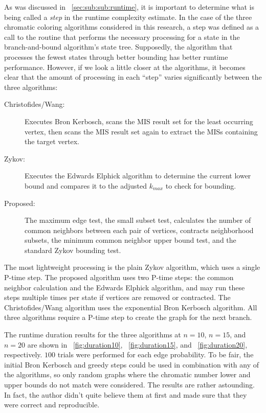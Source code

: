 As was discussed in \sectionname~\ref{sec:sub:sub:runtime}, it is important to determine what is being called a
\emph{step} in the runtime complexity estimate.  In the case of the three chromatic coloring algorithms considered
in this research, a step was defined as a call to the routine that performs the necessary processing for a state in
the branch-and-bound algorithm's state tree.  Supposedly, the algorithm that processes the fewest states through
better bounding has better runtime performance.  However, if we look a little closer at the algorithms, it becomes
clear that the amount of processing in each ``step'' varies significantly between the three algorithms:
\begin{description}
\item[Christofides/Wang:] Executes Bron Kerbosch, scans the MIS result set for the least occurring vertex, then
  scans the MIS result set again to extract the MISs containing the target vertex.
\item [Zykov:] Executes the Edwards Elphick algorithm to determine the current lower bound and compares it to the
  adjusted \(k_{max}\) to check for bounding.
\item [Proposed:] The maximum edge test, the small subset test, calculates the number of common neighbors between
  each pair of vertices, contracts neighborhood subsets, the minimum common neighbor upper bound test, and the
  standard Zykov bounding test.
\end{description}

The most lightweight processing is the plain Zykov algorithm, which uses a single P-time step.  The proposed
algorithm uses two P-time steps: the common neighbor calculation and the Edwards Elphick algorithm, and may run
these steps multiple times per state if vertices are removed or contracted.  The Christofides/Wang algorithm uses
the exponential Bron Kerbosch algorithm.  All three algorithms require a P-time step to create the graph for the
next branch.

The runtime duration results for the three algorithms at \(n=10\), \(n=15\), and \(n=20\) are shown in
\figurename~\ref{fig:duration10}, \figurename~\ref{fig:duration15}, and \figurename~\ref{fig:duration20},
respectively.  \(100\) trials were performed for each edge probability.  To be fair, the initial Bron Kerbosch and
greedy steps could be used in combination with any of the algorithms, so only random graphs where the chromatic
number lower and upper bounds do not match were considered.  The results are rather astounding.  In fact, the
author didn't quite believe them at first and made sure that they were correct and reproducible.

